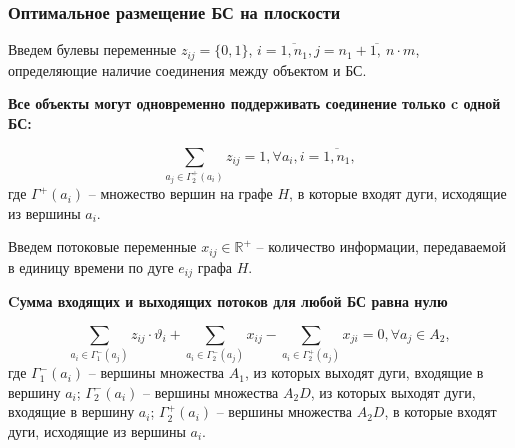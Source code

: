 \begin{frame}
    \frametitle{Оптимальное размещение БС на плоскости}
    \fontsize{8pt}{7.2}\selectfont

    

    Введем булевы переменные $z_{ij} = \{0, 1\}$, $ i = \overline{1,n_1}, j = \overline{n_1+1, \ n \cdot m}$, определяющие наличие соединения между объектом и БС.
    
    \bigskip

    \textbf{Все объекты могут одновременно поддерживать соединение только c одной БС:}

    \begin{equation}\label{eq:part3_only_1_link_from_device}
        \sum_{a_j \in \Gamma_2^+(a_i)} z_{ij} = 1, \forall a_i, i =\overline{1, n_1},
    \end{equation} 
    где $\Gamma^+(a_i)$ -- множество вершин на графе $H$, в которые входят дуги, исходящие из вершины $a_i$.

    \bigskip

    Введем потоковые переменные $x_{ij} \in \mathbb{R}^+$ -- количество информации, передаваемой в единицу времени по дуге $e_{ij}$ графа $H$. 
    
    \bigskip 

    \textbf{Cумма входящих и выходящих потоков для любой БС равна нулю}  

    \begin{equation}\label{eq:part3_sta_io_flows} 
        \sum_{a_i \in \Gamma_1^-(a_j)} z_{ij} \cdot \vartheta_i + \sum_{a_i \in \Gamma_2^-(a_j)} x_{ij} -  \sum_{a_i \in \Gamma_2^+(a_j)} x_{ji} =0 ,\forall a_j \in A_2, 
    \end{equation} 
    где $\Gamma_1^-(a_i)$ -- вершины множества $A_1$, из которых выходят дуги, входящие в вершину $a_i$; $\Gamma_2^-(a_i)$ -- вершины множества $A_2D$, из которых выходят дуги, входящие в  вершину $a_i$; $\Gamma_2^+(a_i)$ -- вершины множества $A_2D$, в которые входят дуги, исходящие из вершины  $a_i$.



\end{frame}

